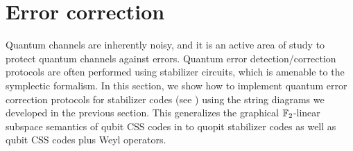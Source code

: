\section{Error correction}
\label{sec:qec}


Quantum channels are inherently noisy, and it is an active area of study to protect quantum channels against errors.  Quantum error detection/correction protocols are often performed using stabilizer circuits, which is amenable to the symplectic formalism.
In this section, we show how to implement quantum error correction protocols for stabilizer codes (see \cite{gottesman}) using the string diagrams we developed in the previous section.   This generalizes the graphical $\mathbb{F}_2$-linear subspace semantics of qubit CSS codes in \cite{grok} to quopit stabilizer codes as well as qubit CSS codes plus Weyl operators.


